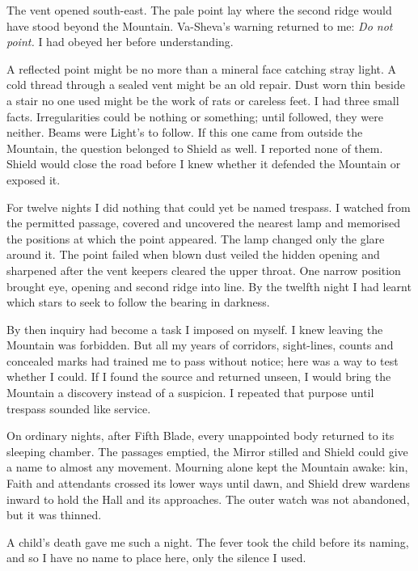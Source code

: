 The vent opened south-east. The pale point lay where the second ridge would have stood beyond the Mountain. Va-Sheva's warning returned to me: \textit{Do not point.} I had obeyed her before understanding.\par

A reflected point might be no more than a mineral face catching stray light. A cold thread through a sealed vent might be an old repair. Dust worn thin beside a stair no one used might be the work of rats or careless feet. I had three small facts. Irregularities could be nothing or something; until followed, they were neither. Beams were Light's to follow. If this one came from outside the Mountain, the question belonged to Shield as well. I reported none of them. Shield would close the road before I knew whether it defended the Mountain or exposed it.\par

For twelve nights I did nothing that could yet be named trespass. I watched from the permitted passage, covered and uncovered the nearest lamp and memorised the positions at which the point appeared. The lamp changed only the glare around it. The point failed when blown dust veiled the hidden opening and sharpened after the vent keepers cleared the upper throat. One narrow position brought eye, opening and second ridge into line. By the twelfth night I had learnt which stars to seek to follow the bearing in darkness.\par

By then inquiry had become a task I imposed on myself. I knew leaving the Mountain was forbidden. But all my years of corridors, sight-lines, counts and concealed marks had trained me to pass without notice; here was a way to test whether I could. If I found the source and returned unseen, I would bring the Mountain a discovery instead of a suspicion. I repeated that purpose until trespass sounded like service.\par

On ordinary nights, after Fifth Blade, every unappointed body returned to its sleeping chamber. The passages emptied, the Mirror stilled and Shield could give a name to almost any movement. Mourning alone kept the Mountain awake: kin, Faith and attendants crossed its lower ways until dawn, and Shield drew wardens inward to hold the Hall and its approaches. The outer watch was not abandoned, but it was thinned.\par

A child's death gave me such a night. The fever took the child before its naming, and so I have no name to place here, only the silence I used.\par

